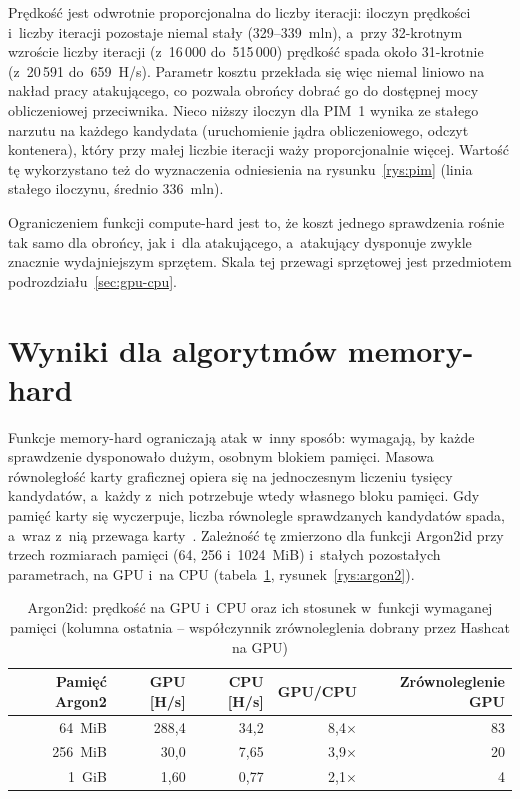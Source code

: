 Prędkość jest odwrotnie proporcjonalna do liczby iteracji: iloczyn prędkości i~liczby iteracji pozostaje niemal stały (329--339~mln), a~przy 32-krotnym wzroście liczby iteracji (z~16\,000 do~515\,000) prędkość spada około 31-krotnie (z~20\,591 do~659~H/s). Parametr kosztu przekłada się więc niemal liniowo na nakład pracy atakującego, co pozwala obrońcy dobrać go do dostępnej mocy obliczeniowej przeciwnika. Nieco niższy iloczyn dla PIM~1 wynika ze stałego narzutu na każdego kandydata (uruchomienie jądra obliczeniowego, odczyt kontenera), który przy małej liczbie iteracji waży proporcjonalnie więcej. Wartość tę wykorzystano też do wyznaczenia odniesienia na rysunku~\ref{rys:pim} (linia stałego iloczynu, średnio 336~mln).

Ograniczeniem funkcji compute-hard jest to, że koszt jednego sprawdzenia rośnie tak samo dla obrońcy, jak i~dla atakującego, a~atakujący dysponuje zwykle znacznie wydajniejszym sprzętem. Skala tej przewagi sprzętowej jest przedmiotem podrozdziału~\ref{sec:gpu-cpu}.

\section{Wyniki dla algorytmów memory-hard}\label{sec:gpu-memory}

Funkcje memory-hard ograniczają atak w~inny sposób: wymagają, by każde sprawdzenie dysponowało dużym, osobnym blokiem pamięci. Masowa równoległość karty graficznej opiera się na jednoczesnym liczeniu tysięcy kandydatów, a~każdy z~nich potrzebuje wtedy własnego bloku pamięci. Gdy pamięć karty się wyczerpuje, liczba równolegle sprawdzanych kandydatów spada, a~wraz z~nią przewaga karty~\cite{eum2023}. Zależność tę zmierzono dla funkcji Argon2id przy trzech rozmiarach pamięci (64, 256 i~1024~MiB) i~stałych pozostałych parametrach, na GPU i~na CPU (tabela~\ref{tab:r5-argon2}, rysunek~\ref{rys:argon2}).

\begin{table}[htbp]
\centering\small
\begin{tabular}{@{}rrrrr@{}}
\toprule
\textbf{Pamięć Argon2} & \textbf{GPU [H/s]} & \textbf{CPU [H/s]} & \textbf{GPU/CPU} & \textbf{Zrównoleglenie GPU} \\
\midrule
64~MiB  & 288,4 & 34,2 & 8,4$\times$ & 83 \\
256~MiB & 30,0  & 7,65 & 3,9$\times$ & 20 \\
1~GiB   & 1,60  & 0,77 & 2,1$\times$ & 4 \\
\bottomrule
\end{tabular}
\caption{Argon2id: prędkość na GPU i~CPU oraz ich stosunek w~funkcji wymaganej pamięci (kolumna ostatnia -- współczynnik zrównoleglenia dobrany przez Hashcat na GPU)}
\label{tab:r5-argon2}
\end{table}


